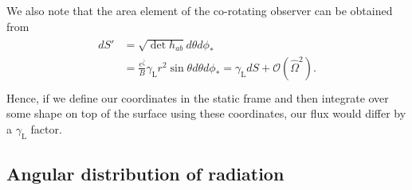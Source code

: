 \documentclass[iop, usenatbib]{emulateapj}
\newcommand{\be}{\begin{equation}}
\newcommand{\ee}{\end{equation}}
\newcommand{\sch}{Schwarzschild }
\newcommand{\rb}{\ensuremath{\bar{r}}}
\newcommand{\Ob}{\ensuremath{\hat{\Omega}}}
\newcommand{\nub}{\ensuremath{\bar{\nu}}}
\newcommand{\zetab}{\ensuremath{\bar{\zeta}}}
\newcommand{\Bb}{\ensuremath{\bar{B}}}
\begin{document}
We also note that the area element of the co-rotating observer can be obtained from
\begin{align}\begin{split}
dS' &= \sqrt{\det h_{ab}} d\theta d\phi_* \\
&= \frac{e^{\zetab}}{B} \gamma_{\mathrm{L}} r^2 \sin\theta d\theta d\phi_* = \gamma_{\mathrm{L}} dS + \mathcal{O}(\Ob^2). \\
\end{split}\end{align}
Hence, if we define our coordinates in the static frame and then integrate over some shape on top of the surface using these coordinates, our flux would differ by a $\gamma_{\mathrm{L}}$ factor.


\subsection{Angular distribution of radiation}
\end{document}
